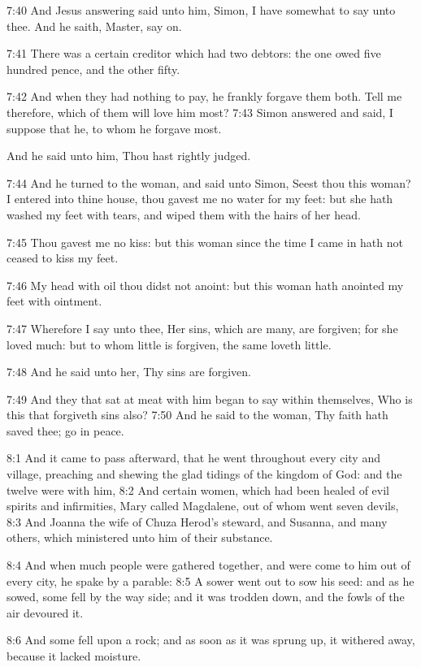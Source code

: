 7:40 And Jesus answering said unto him, Simon, I have somewhat to say
unto thee. And he saith, Master, say on.

7:41 There was a certain creditor which had two debtors: the one owed
five hundred pence, and the other fifty.

7:42 And when they had nothing to pay, he frankly forgave them both.
Tell me therefore, which of them will love him most?  7:43 Simon
answered and said, I suppose that he, to whom he forgave most.

And he said unto him, Thou hast rightly judged.

7:44 And he turned to the woman, and said unto Simon, Seest thou this
woman? I entered into thine house, thou gavest me no water for my
feet: but she hath washed my feet with tears, and wiped them with the
hairs of her head.

7:45 Thou gavest me no kiss: but this woman since the time I came in
hath not ceased to kiss my feet.

7:46 My head with oil thou didst not anoint: but this woman hath
anointed my feet with ointment.

7:47 Wherefore I say unto thee, Her sins, which are many, are
forgiven; for she loved much: but to whom little is forgiven, the same
loveth little.

7:48 And he said unto her, Thy sins are forgiven.

7:49 And they that sat at meat with him began to say within
themselves, Who is this that forgiveth sins also?  7:50 And he said to
the woman, Thy faith hath saved thee; go in peace.

8:1 And it came to pass afterward, that he went throughout every city
and village, preaching and shewing the glad tidings of the kingdom of
God: and the twelve were with him, 8:2 And certain women, which had
been healed of evil spirits and infirmities, Mary called Magdalene,
out of whom went seven devils, 8:3 And Joanna the wife of Chuza
Herod's steward, and Susanna, and many others, which ministered unto
him of their substance.

8:4 And when much people were gathered together, and were come to him
out of every city, he spake by a parable: 8:5 A sower went out to sow
his seed: and as he sowed, some fell by the way side; and it was
trodden down, and the fowls of the air devoured it.

8:6 And some fell upon a rock; and as soon as it was sprung up, it
withered away, because it lacked moisture.


